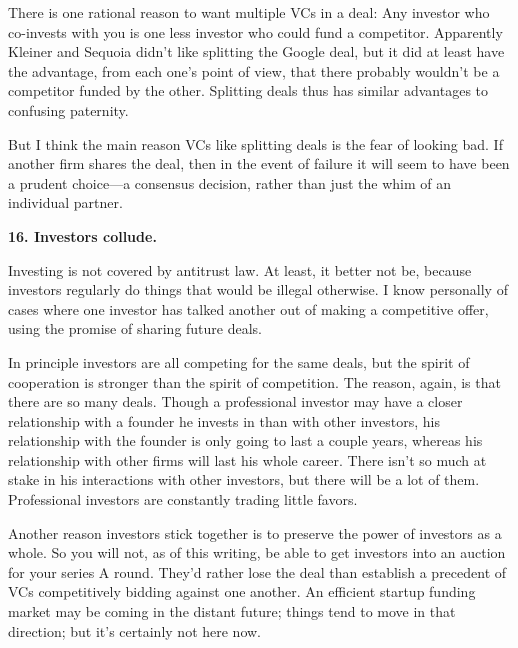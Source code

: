 There is one rational reason to
                  want multiple VCs in a deal: Any investor who co-invests with
                  you is one less investor who could fund a competitor.
                  Apparently Kleiner and Sequoia didn't like splitting the
                  Google deal, but it did at least have the advantage, from each
                  one's point of view, that there probably wouldn't be a
                  competitor funded by the other. Splitting deals thus has
                  similar advantages to confusing paternity.

But I
                  think the main reason VCs like splitting deals is the fear of
                  looking bad. If another firm shares the deal, then in the
                  event of failure it will seem to have been a prudent
                  choice---a consensus decision, rather than just the whim
                  of an individual partner.

\textbf{16. Investors collude.}

Investing is not covered by antitrust law. At
                  least, it better not be, because investors regularly do things
                  that would be illegal otherwise. I know personally of cases
                  where one investor has talked another out of making a
                  competitive offer, using the promise of sharing future
                  deals.

In principle investors are all competing for
                  the same deals, but the spirit of cooperation is stronger than
                  the spirit of competition. The reason, again, is that there
                  are so many deals. Though a professional investor may have a
                  closer relationship with a founder he invests in than with
                  other investors, his relationship with the founder is only
                  going to last a couple years, whereas his relationship with
                  other firms will last his whole career. There isn't so much at
                  stake in his interactions with other investors, but there will
                  be a lot of them. Professional investors are constantly
                  trading little favors.

Another reason investors
                  stick together is to preserve the power of investors as a
                  whole. So you will not, as of this writing, be able to get
                  investors into an auction for your series A round. They'd
                  rather lose the deal than establish a precedent of VCs
                  competitively bidding against one another. An efficient
                  startup funding market may be coming in the distant future;
                  things tend to move in that direction; but it's certainly not
                  here now.
                  

